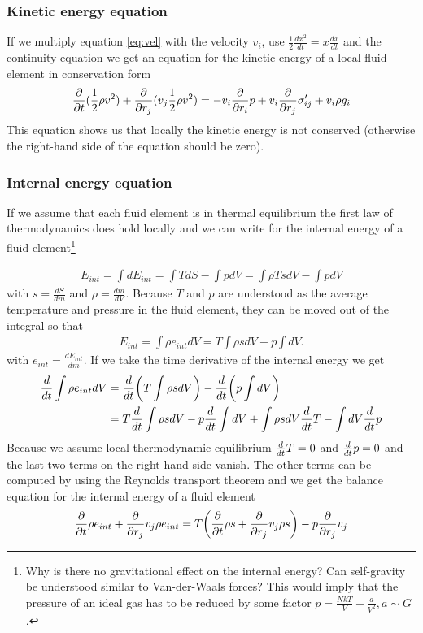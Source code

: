 \subsubsection{Kinetic energy equation}
If we multiply equation \eqref{eq:vel} with the velocity $v_i$, use
$\frac{1}{2}\frac{d x^2}{dt} = x \frac{dx}{dt}$  and the continuity
equation we get an equation for the kinetic energy of a local fluid element in
conservation form
\begin{align}
\frac{\partial}{\partial t}(\frac{1}{2}\rho v^2) + \frac{\partial}{\partial r_j}(v_j\frac{1}{2}\rho v^2) =
-v_i\frac{\partial}{\partial r_i}p + v_i\frac{\partial}{\partial r_j}\sigma'_{ij}+v_i\rho g_i
\end{align}
This equation shows us that locally the kinetic energy is not conserved
(otherwise the right-hand side of the equation should be zero).
\subsubsection{Internal energy equation}
If we assume that each fluid element is in thermal equilibrium the first law of
thermodynamics does hold locally and we can write for the internal
energy of a fluid element\footnote{Why is there no gravitational effect on the 
internal energy? Can self-gravity  be understood similar to 
Van-der-Waals forces? This would imply that the pressure of an ideal gas has 
to be reduced by some factor $p=\frac{NkT}{V}-\frac{a}{V^2}, a \sim G$.}
 
\begin{align}
E_{int} = \int dE_{int} = \int T dS - \int p dV = \int \rho T s dV - \int p dV
\end{align}
with $s=\frac{dS}{dm}$ and $\rho=\frac{dm}{dV}$. Because $T$ and $p$ are
understood as the average temperature and pressure in the fluid element, they can 
be moved out of the integral so that
\begin{align}
E_{int} = \int \rho e_{int} dV = T \int \rho s dV - p \int dV.
\end{align}
with $e_{int}=\frac{dE_{int}}{dm}$.
If we take the time derivative of the internal energy we get
\begin{align}
\begin{split}
\frac{d}{d t} \int \rho e_{int} dV &= \frac{d}{d t}{ \left( T \int \rho s dV \right) }-\frac{d}{d t}{ \left( p \int
dV \right) } \\
&= T \frac{d}{d t} \int \rho s dV - p \frac{d}{d t} \int dV + \int \rho s dV \frac{d}{d t}T 
- \int dV \frac{d}{d t} p
\end{split}
\end{align}
Because we assume local thermodynamic equilibrium $\frac{d}{d t} T=0$ and $\frac{d}{d t} p=0$
and the last two terms on the right hand side vanish. The other terms can be
computed by using the Reynolds transport theorem and we get the balance
equation for the internal energy of a fluid element
\begin{align}
\frac{\partial}{\partial t} \rho e_{int} + \frac{\partial}{\partial r_j} v_j \rho e_{int} = T { \left( \frac{\partial}{\partial t} \rho s +
\frac{\partial}{\partial r_j} v_j \rho s \right) } -p \frac{\partial}{\partial r_j} v_j \label{eq:eint}
\end{align}

